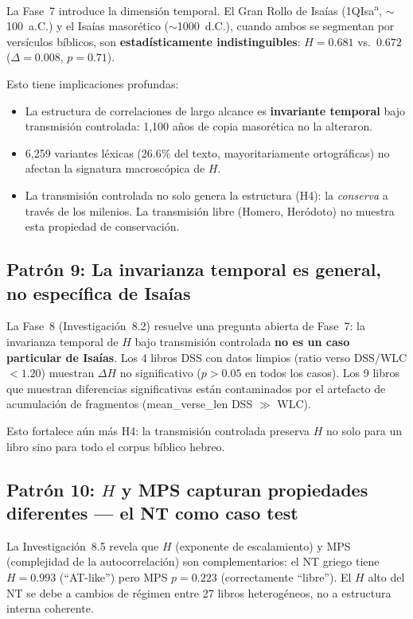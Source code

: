 \documentclass[12pt,a4paper]{article}
\begin{document}
La Fase~7 introduce la dimensi\'on temporal. El Gran Rollo de Isa\'ias
(1QIsa\textsuperscript{a}, $\sim$100~a.C.) y el Isa\'ias masor\'etico ($\sim$1000~d.C.),
cuando ambos se segmentan por vers\'iculos b\'iblicos, son
\textbf{estad\'isticamente indistinguibles}:
$H = 0.681$ vs.\ $0.672$ ($\Delta = 0.008$, $p = 0.71$).

Esto tiene implicaciones profundas:
\begin{itemize}[leftmargin=2em]
\item La estructura de correlaciones de largo alcance es \textbf{invariante temporal}
      bajo transmisi\'on controlada: 1,100 a\~nos de copia masor\'etica no la alteraron.
\item 6,259 variantes l\'exicas (26.6\% del texto, mayoritariamente ortogr\'aficas)
      no afectan la signatura macrosc\'opica de $H$.
\item La transmisi\'on controlada no solo genera la estructura (H4):
      la \emph{conserva} a trav\'es de los milenios. La transmisi\'on libre
      (Homero, Her\'odoto) no muestra esta propiedad de conservaci\'on.
\end{itemize}

\subsection{Patr\'on 9: La invarianza temporal es general, no espec\'ifica de Isa\'ias}

La Fase~8 (Investigaci\'on~8.2) resuelve una pregunta abierta de Fase~7:
la invarianza temporal de $H$ bajo transmisi\'on controlada \textbf{no es un caso particular
de Isa\'ias}. Los 4 libros DSS con datos limpios (ratio verso DSS/WLC $< 1.20$)
muestran $\Delta H$ no significativo ($p > 0.05$ en todos los casos).
Los 9 libros que muestran diferencias significativas est\'an contaminados por el
artefacto de acumulaci\'on de fragmentos (mean\_verse\_len DSS $\gg$ WLC).

Esto fortalece a\'un m\'as H4: la transmisi\'on controlada preserva $H$ no solo
para un libro sino para todo el corpus b\'iblico hebreo.

\subsection{Patr\'on 10: $H$ y MPS capturan propiedades diferentes --- el NT como caso test}

La Investigaci\'on~8.5 revela que $H$ (exponente de escalamiento) y MPS
(complejidad de la autocorrelaci\'on) son complementarios: el NT griego
tiene $H = 0.993$ (``AT-like'') pero MPS $p = 0.223$ (correctamente ``libre'').
El $H$ alto del NT se debe a cambios de r\'egimen entre 27 libros heterog\'eneos,
no a estructura interna coherente.
\end{document}
